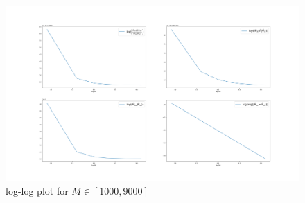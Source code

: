 \documentclass[11pt, letterpaper, onecolumn]{article}
\begin{document}
\begin{figure}[!h]
    \centering
    \includegraphics[width=.9\textwidth]{plots_for_1000M9000.png}
    \caption{log-log plot for $M\in[1000, 9000]$ }
\end{figure}\noindent\newline












    
	










	

	
	





	
\end{document}
